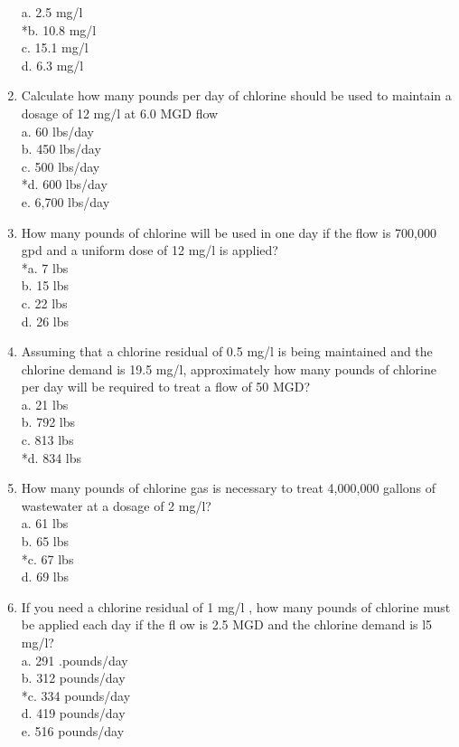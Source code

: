 \begin{enumerate}
a. 2.5 mg/l \\
*b. 10.8 mg/l \\
c. 15.1 mg/l \\
d. 6.3 mg/l \\
\item Calculate how many pounds per day of chlorine should be used to maintain a dosage of 12 mg/l at 6.0 MGD flow \\
a. 60 lbs/day \\
b. 450 lbs/day \\
c. 500 lbs/day \\
*d. 600 lbs/day \\
e. 6,700 lbs/day \\
\item How many pounds of chlorine will be used in one day if the flow is 700,000 gpd and a uniform dose of 12 mg/l is applied? \\
*a. 7 lbs \\
b. 15 lbs \\
c. 22 lbs \\
d. 26 lbs \\
\item Assuming that a chlorine residual of 0.5 mg/l is being maintained and the chlorine demand is 19.5 mg/l, approximately how many pounds of chlorine per day will be required to treat a flow of 50 MGD? \\
a. 21 lbs \\
b. 792 lbs \\
c. 813 lbs \\
*d. 834 lbs \\
\item How many pounds of chlorine gas is necessary to treat 4,000,000 gallons of wastewater at a dosage of 2 mg/l? \\
a. 61 lbs \\
b. 65 lbs \\
*c. 67 lbs \\
d. 69 lbs \\
\item If you need a chlorine residual of 1 mg/l , how many pounds of chlorine must be applied each day if the fl ow is 2.5 MGD and the chlorine demand is l5 mg/l? \\
a. 291 .pounds/day \\
b. 312 pounds/day \\
*c. 334 pounds/day \\
d. 419 pounds/day \\
e. 516 pounds/day \\

\end{enumerate}
